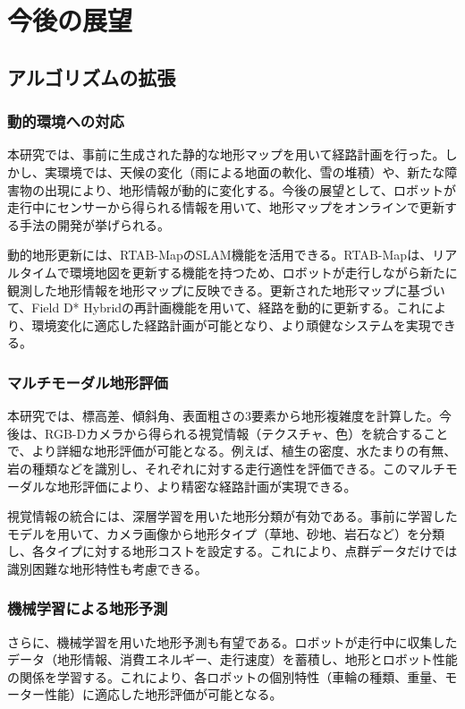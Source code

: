 \chapter{今後の展望}

\section{アルゴリズムの拡張}

\subsection{動的環境への対応}

本研究では、事前に生成された静的な地形マップを用いて経路計画を行った。しかし、実環境では、天候の変化（雨による地面の軟化、雪の堆積）や、新たな障害物の出現により、地形情報が動的に変化する。今後の展望として、ロボットが走行中にセンサーから得られる情報を用いて、地形マップをオンラインで更新する手法の開発が挙げられる。

動的地形更新には、RTAB-MapのSLAM機能を活用できる。RTAB-Mapは、リアルタイムで環境地図を更新する機能を持つため、ロボットが走行しながら新たに観測した地形情報を地形マップに反映できる。更新された地形マップに基づいて、Field D* Hybridの再計画機能を用いて、経路を動的に更新する。これにより、環境変化に適応した経路計画が可能となり、より頑健なシステムを実現できる。

\subsection{マルチモーダル地形評価}

本研究では、標高差、傾斜角、表面粗さの3要素から地形複雑度を計算した。今後は、RGB-Dカメラから得られる視覚情報（テクスチャ、色）を統合することで、より詳細な地形評価が可能となる。例えば、植生の密度、水たまりの有無、岩の種類などを識別し、それぞれに対する走行適性を評価できる。このマルチモーダルな地形評価により、より精密な経路計画が実現できる。

視覚情報の統合には、深層学習を用いた地形分類が有効である。事前に学習したモデルを用いて、カメラ画像から地形タイプ（草地、砂地、岩石など）を分類し、各タイプに対する地形コストを設定する。これにより、点群データだけでは識別困難な地形特性も考慮できる。

\subsection{機械学習による地形予測}

さらに、機械学習を用いた地形予測も有望である。ロボットが走行中に収集したデータ（地形情報、消費エネルギー、走行速度）を蓄積し、地形とロボット性能の関係を学習する。これにより、各ロボットの個別特性（車輪の種類、重量、モーター性能）に適応した地形評価が可能となる。

